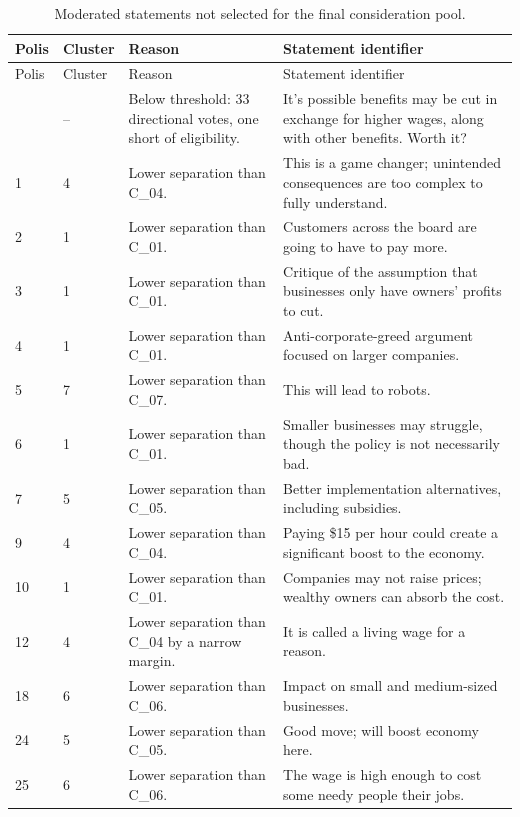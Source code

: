 \begingroup
\scriptsize
\setlength{\tabcolsep}{2pt}
\begin{longtable}{p{0.38in}p{0.42in}p{1.40in}p{3.80in}}
\caption{Moderated statements not selected for the final consideration pool.}\label{tab:omitted-statements}\\
\toprule
Polis & Cluster & Reason & Statement identifier \\
\midrule
\endfirsthead
\toprule
Polis & Cluster & Reason & Statement identifier \\
\midrule
\endhead
\bottomrule
\endfoot
43 & -- & Below threshold: 33 directional votes, one short of eligibility. & It's possible benefits may be cut in exchange for higher wages, along with other benefits. Worth it? \\
1 & 4 & Lower separation than C\_04. & This is a game changer; unintended consequences are too complex to fully understand. \\
2 & 1 & Lower separation than C\_01. & Customers across the board are going to have to pay more. \\
3 & 1 & Lower separation than C\_01. & Critique of the assumption that businesses only have owners' profits to cut. \\
4 & 1 & Lower separation than C\_01. & Anti-corporate-greed argument focused on larger companies. \\
5 & 7 & Lower separation than C\_07. & This will lead to robots. \\
6 & 1 & Lower separation than C\_01. & Smaller businesses may struggle, though the policy is not necessarily bad. \\
7 & 5 & Lower separation than C\_05. & Better implementation alternatives, including subsidies. \\
9 & 4 & Lower separation than C\_04. & Paying \$15 per hour could create a significant boost to the economy. \\
10 & 1 & Lower separation than C\_01. & Companies may not raise prices; wealthy owners can absorb the cost. \\
12 & 4 & Lower separation than C\_04 by a narrow margin. & It is called a living wage for a reason. \\
18 & 6 & Lower separation than C\_06. & Impact on small and medium-sized businesses. \\
24 & 5 & Lower separation than C\_05. & Good move; will boost economy here. \\
25 & 6 & Lower separation than C\_06. & The wage is high enough to cost some needy people their jobs. \\

\end{longtable}
